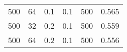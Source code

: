 \begin{table}[H]
\begin{tabular}{c|c|c|c|r|c}
    500                                & 64                             & 0.1                         & 0.1                                  & 500                                 & 0.565                  \\
    500                                & 32                             & 0.2                         & 0.1                                  & 500                                 & 0.559                  \\
    500                                & 64                             & 0.2                         & 0.1                                  & 500                                 & 0.556                  \\
    \hline               
\end{tabular}
\end{table}